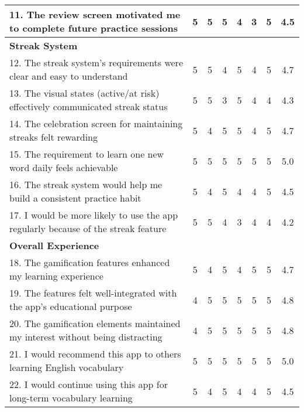 \begin{table}[ht]
{\begin{tabular}{|p{}|c|c|c|c|c|c|c|}
            \hline
            11. The review screen motivated me to complete future practice sessions & 5 & 5 & 5 & 4 & 3 & 5 & 4.5 \\
            \hline
            \multicolumn{8}{|l|}{\textbf{Streak System}} \\
            \hline
            12. The streak system's requirements were clear and easy to understand & 5 & 5 & 4 & 5 & 4 & 5 & 4.7 \\
            \hline
            13. The visual states (active/at risk) effectively communicated streak status & 5 & 5 & 3 & 5 & 4 & 4 & 4.3 \\
            \hline
            14. The celebration screen for maintaining streaks felt rewarding & 5 & 4 & 5 & 5 & 4 & 5 & 4.7 \\
            \hline
            15. The requirement to learn one new word daily feels achievable & 5 & 5 & 5 & 5 & 5 & 5 & 5.0 \\
            \hline
            16. The streak system would help me build a consistent practice habit & 5 & 4 & 5 & 4 & 4 & 5 & 4.5 \\
            \hline
            17. I would be more likely to use the app regularly because of the streak feature & 5 & 5 & 4 & 3 & 4 & 4 & 4.2 \\
            \hline
            \multicolumn{8}{|l|}{\textbf{Overall Experience}} \\
            \hline
            18. The gamification features enhanced my learning experience & 5 & 4 & 5 & 4 & 5 & 5 & 4.7 \\
            \hline
            19. The features felt well-integrated with the app's educational purpose & 4 & 5 & 5 & 5 & 5 & 5 & 4.8 \\
            \hline
            20. The gamification elements maintained my interest without being distracting & 4 & 5 & 5 & 5 & 5 & 5 & 4.8 \\
            \hline
            21. I would recommend this app to others learning English vocabulary & 5 & 5 & 5 & 5 & 5 & 5 & 5.0 \\
            \hline
            22. I would continue using this app for long-term vocabulary learning & 5 & 4 & 5 & 4 & 4 & 5 & 4.5 \\
            \hline
        \end{tabular}
    }
\end{table}